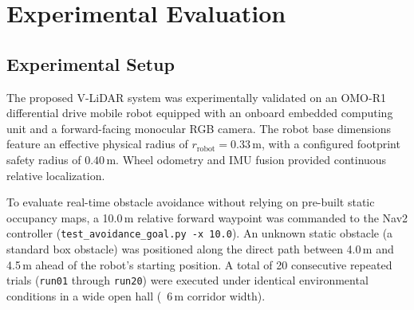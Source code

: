 \section{Experimental Evaluation}

\subsection{Experimental Setup}
The proposed V-LiDAR system was experimentally validated on an OMO-R1 differential drive mobile robot equipped with an onboard embedded computing unit and a forward-facing monocular RGB camera. The robot base dimensions feature an effective physical radius of $r_{\text{robot}} = 0.33\,\text{m}$, with a configured footprint safety radius of $0.40\,\text{m}$. Wheel odometry and IMU fusion provided continuous relative localization.

To evaluate real-time obstacle avoidance without relying on pre-built static occupancy maps, a 10.0\,m relative forward waypoint was commanded to the Nav2 controller (\texttt{test\_avoidance\_goal.py -x 10.0}). An unknown static obstacle (a standard box obstacle) was positioned along the direct path between 4.0\,m and 4.5\,m ahead of the robot's starting position. A total of 20 consecutive repeated trials (\texttt{run01} through \texttt{run20}) were executed under identical environmental conditions in a wide open hall (~6\,m corridor width).

\begin{table}[t]
\centering
\caption{Summary of 20-Trial Obstacle Avoidance Experiment}
\label{tab:exp_summary}
\end{table}


